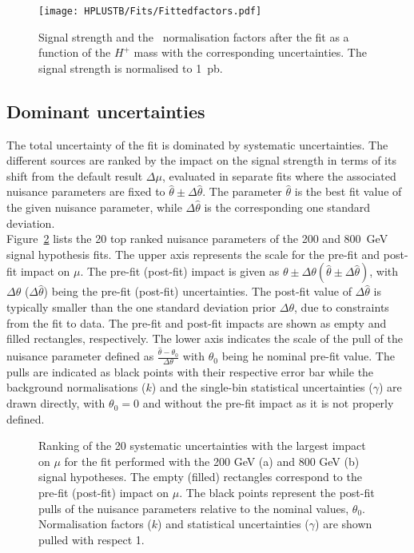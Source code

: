 \begin{figure}[htb]
    \RawFloats
    \centering
    \texttt{[image: HPLUSTB/Fits/Fittedfactors.pdf]}
    \caption{Signal strength and the \ttHF\ normalisation factors after the fit as a function of the $H^+$ mass with the corresponding uncertainties. The signal strength is normalised to 1~pb.   
    }
    \label{Hplustb:fittedfactorsvsmass}
\end{figure}


\subsection{Dominant uncertainties}

The total uncertainty of the fit is dominated by systematic uncertainties. The different sources are ranked by the impact on the signal strength in terms of its shift from the default result $\Delta\mu$, evaluated in separate fits where the associated nuisance parameters are fixed to $\hat{\theta}\pm\Delta\hat{\theta}$. The parameter $\hat{\theta}$ is the best fit value of the given nuisance parameter, while $\Delta\hat{\theta}$ is the corresponding one standard deviation.\\

Figure~\ref{Hplustb:ranking200800} lists the 20 top ranked nuisance parameters of the 200 and 800~GeV signal hypothesis fits. The upper axis represents the scale for the pre-fit and post-fit impact on $\mu$. The pre-fit (post-fit) impact is given as $\theta \pm \Delta\theta (\hat{\theta} \pm \Delta\hat{\theta})$, with $\Delta\theta$ ($\Delta\hat{\theta}$) being the pre-fit (post-fit) uncertainties. The post-fit value of $\Delta\hat{\theta}$ is typically smaller than the one standard deviation prior $\Delta\theta$, due to constraints from the fit to data. The pre-fit and post-fit impacts are shown as empty and filled rectangles, respectively. The lower axis indicates the scale of the pull of the nuisance parameter defined as $\frac{\hat{\theta} -\theta_0}{\Delta\theta}$ with $\theta_0$ being he nominal pre-fit value. The pulls are indicated as black points with their respective error bar while the background normalisations ($k$) and the single-bin statistical uncertainties ($\gamma$) are drawn directly, with $\theta_0=0$ and without the pre-fit impact as it is not properly defined.

\begin{figure}[tb]
    \RawFloats
    \centering
    \caption{Ranking of the 20 systematic uncertainties with the largest impact on $\mu$ for the fit performed with the 200 GeV (a) and 800 GeV (b) signal hypotheses. The empty (filled) rectangles correspond
    to the pre-fit (post-fit) impact on $\mu$. The black points represent the post-fit pulls of the nuisance parameters relative to the nominal values, $\theta_0$. Normalisation factors ($k$) and statistical uncertainties ($\gamma$) are shown pulled with respect 1.
    }
    \label{Hplustb:ranking200800}
\end{figure}

